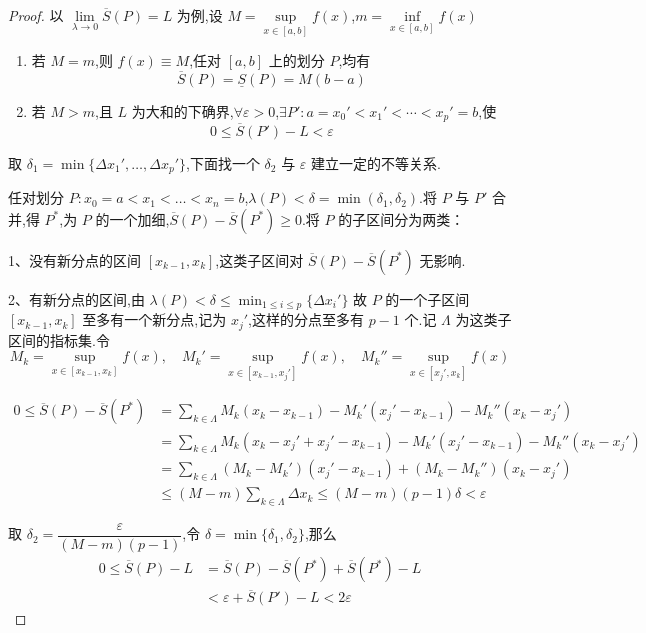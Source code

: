 \begin{proof}
	以 $\lim\limits_{\lambda \to 0} \overline{S}(P) = L$ 为例,设 $M = \sup\limits_{x \in [a,b]} f(x)$,$m = \inf\limits_{x \in [a,b]} f(x)$
	\begin{enumerate}
		\item 若 $M=m$,则 $f(x) \equiv M$,任对 $[a,b]$ 上的划分 $P$,均有
		\[
		\overline{S}(P) = \underline{S}(P) = M(b-a)
		\]
		\item  若 $M>m$,且 $L$ 为大和的下确界,$\forall \varepsilon>0$,$\exists P': a = x_0' < x_1' < \cdots < x_p' = b$,使
		\[
		0 \leq \overline{S}(P') - L < \varepsilon
		\]
	\end{enumerate}
	取 $\delta_1 = \min\{\Delta x_1', \dots, \Delta x_p'\}$,下面找一个 $\delta_2$ 与 $\varepsilon$ 建立一定的不等关系.
	
	任对划分 $P: x_0=a < x_1 < \dots < x_n = b$,$\lambda(P) < \delta=\min(\delta_1,\delta_2)$.将 $P$ 与 $P'$ 合并,得 $P^*$,为 $P$ 的一个加细,$\overline{S}(P) - \overline{S}(P^*) \geq 0$.将 $P$ 的子区间分为两类：
	
	1、没有新分点的区间 $[x_{k-1}, x_k]$,这类子区间对 $\overline{S}(P) - \overline{S}(P^*)$ 无影响.
	
	2、有新分点的区间,由 $\lambda(P) < \delta \leq \min_{1\leq i\leq p} \{\Delta x_i'\}$
	故 $P$ 的一个子区间 $[x_{k-1}, x_k]$ 至多有一个新分点,记为 $x_j'$,这样的分点至多有 $p-1$ 个.记 $\Lambda$ 为这类子区间的指标集.令
	\[
	M_k = \sup_{x \in [x_{k-1}, x_k]} f(x), \quad M_k' = \sup_{x \in [x_{k-1}, x_j']} f(x), \quad M_k'' = \sup_{x \in [x_j', x_k]} f(x)
	\]
	
	\[
	\begin{aligned}
		0 \leq \overline{S}(P) - \overline{S}(P^*) &= \sum_{k \in \Lambda} M_k (x_k - x_{k-1}) - M_k' (x_j' - x_{k-1}) - M_k'' (x_k - x_j') \\
		&= \sum_{k \in \Lambda} M_k (x_k - x_j' + x_j' - x_{k-1}) - M_k' (x_j' - x_{k-1}) - M_k'' (x_k - x_j') \\
		&= \sum_{k \in \Lambda} (M_k - M_k')(x_j' - x_{k-1}) + (M_k - M_k'')(x_k - x_j') \\
		&\leq (M - m) \sum_{k \in \Lambda} \Delta x_k \leq (M - m)(p-1)\delta < \varepsilon
	\end{aligned}
	\]
	
	取 $\delta_2 = \dfrac{\varepsilon}{(M - m)(p-1)}$,令 $\delta = \min\{\delta_1, \delta_2\}$,那么
	\[
	\begin{aligned}
		0 \leq \overline{S}(P) - L &= \overline{S}(P) - \overline{S}(P^*) + \overline{S}(P^*) - L \\
		&< \varepsilon + \overline{S}(P') - L < 2\varepsilon
	\end{aligned}
	\]
	
	
\end{proof}
